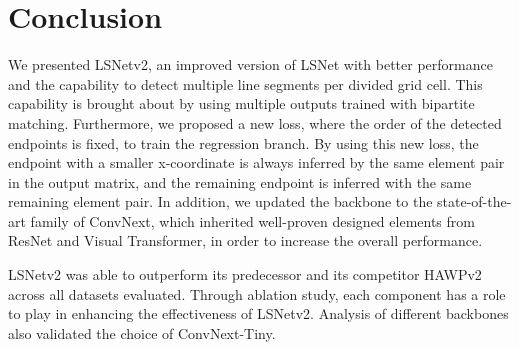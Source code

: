 \documentclass[journal]{IEEEtran}
\begin{document}






 















\section{Conclusion}
We presented LSNetv2, an improved version of LSNet with better performance and the capability to detect multiple line segments per divided grid cell. This capability is brought about by using multiple outputs trained with bipartite matching. Furthermore, we proposed a new loss, where the order of the detected endpoints is fixed, to train the regression branch. By using this new loss, the endpoint with a smaller x-coordinate is always inferred by the same element pair in the output matrix, and the remaining endpoint is inferred with the same remaining element pair. In addition, we updated the backbone to the state-of-the-art family of ConvNext, which inherited well-proven designed elements from ResNet and Visual Transformer, in order to increase the overall performance.

LSNetv2 was able to outperform its predecessor and its competitor HAWPv2 across all datasets evaluated. Through ablation study, each component has a role to play in enhancing the effectiveness of LSNetv2. Analysis of different backbones also validated the choice of ConvNext-Tiny.







\end{document}
